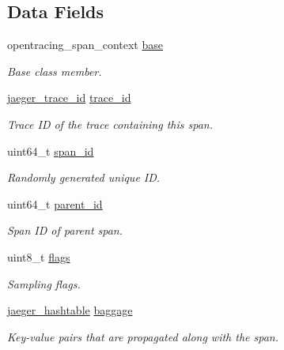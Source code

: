 \subsection*{Data Fields}
\begin{DoxyCompactItemize}
\item 
opentracing\+\_\+span\+\_\+context \mbox{\hyperlink{structjaeger__span__context_a306504cd5d3064edc49c70e8d485a067}{base}}
\begin{DoxyCompactList}\small\item\em Base class member. \end{DoxyCompactList}\item 
\mbox{\hyperlink{structjaeger__trace__id}{jaeger\+\_\+trace\+\_\+id}} \mbox{\hyperlink{structjaeger__span__context_aecace9cbf8c8432cb8c2f5d5dc65b994}{trace\+\_\+id}}
\begin{DoxyCompactList}\small\item\em Trace ID of the trace containing this span. \end{DoxyCompactList}\item 
uint64\+\_\+t \mbox{\hyperlink{structjaeger__span__context_ad78982af52840b14a8bee7d3404755d3}{span\+\_\+id}}
\begin{DoxyCompactList}\small\item\em Randomly generated unique ID. \end{DoxyCompactList}\item 
uint64\+\_\+t \mbox{\hyperlink{structjaeger__span__context_a66ebaca50e8853b5fab9d4ebe82cfb32}{parent\+\_\+id}}
\begin{DoxyCompactList}\small\item\em Span ID of parent span. \end{DoxyCompactList}\item 
uint8\+\_\+t \mbox{\hyperlink{structjaeger__span__context_a7b79bf9f7994b640a154665cce75ec68}{flags}}
\begin{DoxyCompactList}\small\item\em Sampling flags. \end{DoxyCompactList}\item 
\mbox{\hyperlink{structjaeger__hashtable}{jaeger\+\_\+hashtable}} \mbox{\hyperlink{structjaeger__span__context_aedfb64b810e041a807dd6e0ea8274215}{baggage}}
\begin{DoxyCompactList}\small\item\em Key-\/value pairs that are propagated along with the span. \end{DoxyCompactList}\item 

\end{DoxyCompactItemize}
